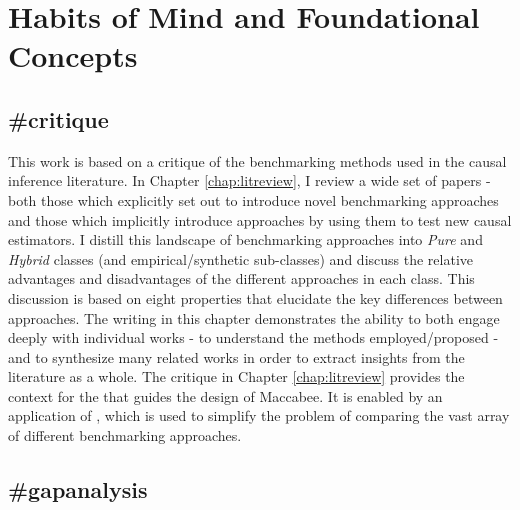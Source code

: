 \documentclass[./main.tex]{subfiles}
\begin{document}
\section{Habits of Mind and Foundational Concepts}

\subsection{\textbf{\#critique}}
\label{hc:critique}

This work is based on a critique of the benchmarking methods used in the causal inference literature. In Chapter \ref{chap:litreview}, I review a wide set of papers - both those which explicitly set out to introduce novel benchmarking approaches and those which implicitly introduce approaches by using them to test new causal estimators. I distill this landscape of benchmarking approaches into \textit{Pure} and \textit{Hybrid} classes (and empirical/synthetic sub-classes) and discuss the relative advantages and disadvantages of the different approaches in each class. This discussion is based on eight properties that elucidate the key differences between approaches. The writing in this chapter demonstrates the ability to both engage deeply with individual works - to understand the methods employed/proposed - and to synthesize many related works in order to extract insights from the literature as a whole. The critique in Chapter \ref{chap:litreview} provides the context for the  that guides the design of Maccabee. It is enabled by an application of , which is used to simplify the problem of comparing the vast array of different benchmarking approaches.


\subsection{\textbf{\#gapanalysis}}
\label{hc:gapanalysis}
\end{document}
